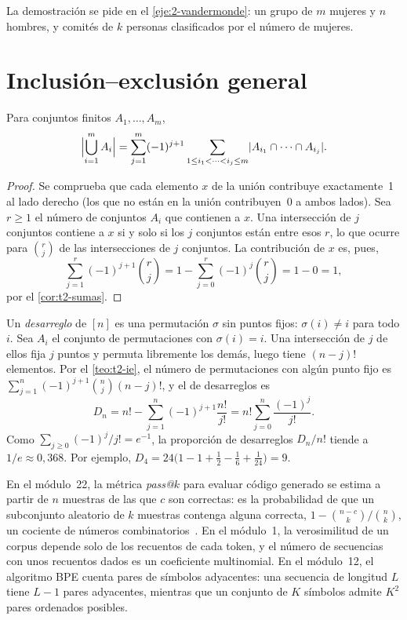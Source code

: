 La demostración se pide en el \cref{eje:2-vandermonde}: un grupo de $m$ mujeres y $n$ hombres, y comités de $k$ personas clasificados por el número de mujeres.

\section{Inclusión--exclusión general}

\begin{teorema}\label{teo:t2-ie}
Para conjuntos finitos $A_1,\dots,A_m$,
\[
\Bigl|\bigcup_{i=1}^{m}A_i\Bigr|=\sum_{j=1}^{m}(-1)^{j+1}\sum_{1\le i_1<\dots<i_j\le m}\lvert A_{i_1}\cap\dots\cap A_{i_j}\rvert.
\]
\end{teorema}

\begin{proof}
Se comprueba que cada elemento $x$ de la unión contribuye exactamente~1 al lado derecho (los que no están en la unión contribuyen~0 a ambos lados). Sea $r\ge1$ el número de conjuntos $A_i$ que contienen a $x$. Una intersección de $j$ conjuntos contiene a $x$ si y solo si los $j$ conjuntos están entre esos $r$, lo que ocurre para $\binom{r}{j}$ de las intersecciones de $j$ conjuntos. La contribución de $x$ es, pues,
\[
\sum_{j=1}^{r}(-1)^{j+1}\binom{r}{j}=1-\sum_{j=0}^{r}(-1)^{j}\binom{r}{j}=1-0=1,
\]
por el \cref{cor:t2-sumas}.
\end{proof}

\begin{ejemplo}[Desarreglos]\label{ej:t2-desarreglos}
Un \emph{desarreglo} de $[n]$ es una permutación $\sigma$ sin puntos fijos: $\sigma(i)\neq i$ para todo $i$. Sea $A_i$ el conjunto de permutaciones con $\sigma(i)=i$. Una intersección de $j$ de ellos fija $j$ puntos y permuta libremente los demás, luego tiene $(n-j)!$ elementos. Por el \cref{teo:t2-ie}, el número de permutaciones con algún punto fijo es $\sum_{j=1}^{n}(-1)^{j+1}\binom{n}{j}(n-j)!$, y el de desarreglos es
\[
D_n=n!-\sum_{j=1}^{n}(-1)^{j+1}\frac{n!}{j!}=n!\sum_{j=0}^{n}\frac{(-1)^{j}}{j!}.
\]
Como $\sum_{j\ge0}(-1)^{j}/j!=e^{-1}$, la proporción de desarreglos $D_n/n!$ tiende a $1/e\approx0{,}368$. Por ejemplo, $D_4=24\bigl(1-1+\tfrac12-\tfrac16+\tfrac1{24}\bigr)=9$.
\end{ejemplo}

\begin{observacion}
En el módulo~22, la métrica \emph{pass@$k$} para evaluar código generado se estima a partir de $n$ muestras de las que $c$ son correctas: es la probabilidad de que un subconjunto aleatorio de $k$ muestras contenga alguna correcta, $1-\binom{n-c}{k}\big/\binom{n}{k}$, un cociente de números combinatorios~\cite[§2.1]{chen}. En el módulo~1, la verosimilitud de un corpus depende solo de los recuentos de cada token, y el número de secuencias con unos recuentos dados es un coeficiente multinomial. En el módulo~12, el algoritmo BPE cuenta pares de símbolos adyacentes: una secuencia de longitud $L$ tiene $L-1$ pares adyacentes, mientras que un conjunto de $K$ símbolos admite $K^{2}$ pares ordenados posibles.
\end{observacion}


